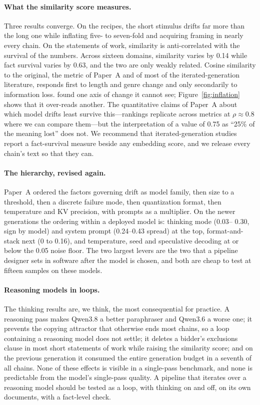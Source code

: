 \documentclass[11pt]{article}
\begin{document}
\paragraph{What the similarity score measures.}
Three results converge. On the recipes, the short stimulus drifts far more
than the long one while inflating five- to seven-fold and acquiring
framing in nearly every chain. On the statements of work, similarity is
anti-correlated with the survival of the numbers. Across sixteen domains,
similarity varies by 0.14 while fact survival varies by 0.63, and the two
are only weakly related. Cosine similarity to the original, the metric of
Paper~A and of most of the iterated-generation literature, responds first
to length and genre change and only secondarily to information loss.
\citet{belem2026certainty} found one axis of change it cannot see;
Figure~\ref{fig:inflation} shows that it over-reads another. The
quantitative claims of Paper~A about which model drifts least survive
this---rankings replicate across metrics at $\rho\approx0.8$ where we can
compare them---but the interpretation of a value of 0.75 as ``25\% of the
meaning lost'' does not. We recommend that iterated-generation studies
report a fact-survival measure beside any embedding score, and we release
every chain's text so that they can.

\paragraph{The hierarchy, revised again.}
Paper~A ordered the factors governing drift as model family, then size to a
threshold, then a discrete failure mode, then quantization format, then
temperature and KV precision, with prompts as a multiplier. On the newer
generations the ordering within a deployed model is: thinking mode (0.03--
0.30, sign by model) and system prompt (0.24--0.43 spread) at the top,
format-and-stack next (0 to 0.16), and temperature, seed and speculative
decoding at or below the 0.05 noise floor. The two largest levers are the
two that a pipeline designer sets in software after the model is chosen,
and both are cheap to test at fifteen samples on these models.

\paragraph{Reasoning models in loops.}
The thinking results are, we think, the most consequential for practice. A
reasoning pass makes Qwen3.8 a better paraphraser and Qwen3.6 a worse one;
it prevents the copying attractor that otherwise ends most chains, so a
loop containing a reasoning model does not settle; it deletes a bidder's
exclusions clause in most short statements of work while raising the
similarity score; and on the previous generation it consumed the entire
generation budget in a seventh of all chains. None of these effects is
visible in a single-pass benchmark, and none is predictable from the model's
single-pass quality. A pipeline that iterates over a reasoning model should
be tested as a loop, with thinking on and off, on its own documents, with
a fact-level check.
\end{document}
